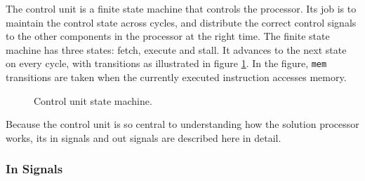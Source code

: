 The control unit is a finite state machine that controls the processor.
Its job is to maintain the control state across cycles, and distribute the correct control signals to the other components in the processor at the right time.
The finite state machine has three states: fetch, execute and stall.
It advances to the next state on every cycle, with transitions as illustrated in figure \ref{figure:control-unit-state-machine}.
In the figure, \texttt{mem} transitions are taken when the currently executed instruction accesses memory.

\begin{figure}[h]
    \begin{center}
            \caption{Control unit state machine.}
            \label{figure:control-unit-state-machine}
    \end{center}
\end{figure}

Because the control unit is so central to understanding how the solution processor works, its in signals and out signals are described here in detail.

\subsubsection{In Signals}

